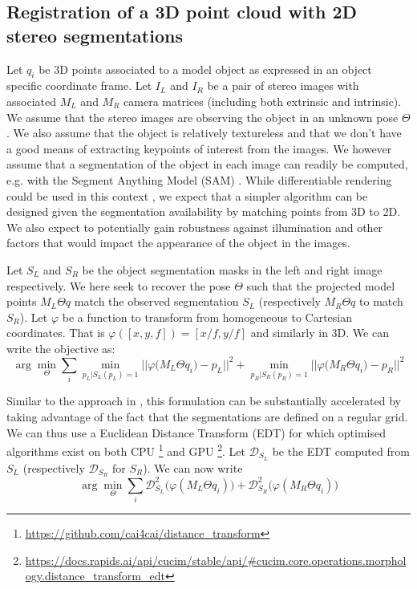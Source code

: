 \FloatBarrier
\subsection{Registration of a 3D point cloud with 2D stereo segmentations}
%
Let $q_i$ be 3D points associated to a model object as expressed in an object specific coordinate frame.
Let $I_L$ and $I_R$ be a pair of stereo images with associated $M_L$ and $M_R$ camera matrices (including both extrinsic and intrinsic).
We assume that the stereo images are observing the object in an unknown pose $\Theta$.
We also assume that the object is relatively textureless and that we don't have a good means of extracting keypoints of interest from the images.
We however assume that a segmentation of the object in each image can readily be computed, e.g. with the Segment Anything Model (SAM) \cite{Kirillov:arxiv:2023}.
%
While differentiable rendering could be used in this context \cite{Hannemose:SPIE:2019,Labbe:CVPR:2021,Chen:RAL:2023},
we expect that a simpler algorithm can be designed given the segmentation availability by matching points from 3D to 2D.
We also expect to potentially gain robustness against illumination and other factors that would impact the appearance of the object in the images.

Let $S_L$ and $S_R$ be the object segmentation masks in the left and right image respectively.
We here seek to recover the pose $\Theta$ such that the projected model points ${M_L \Theta q}$ match the observed segmentation $S_L$ (respectively ${M_R \Theta q}$ to match $S_R$).
Let $\varphi$ be a function to transform from homogeneous to Cartesian coordinates.
That is $\varphi([x,y,f])=[x/f,y/f]$ and similarly in 3D.
We can write the objective as:
\begin{equation}
\arg\min_{\Theta} \sum_i
\min_{p_L|S_L(p_L)=1}|| \varphi\big(M_L \Theta q_i\big) - p_L||^2
+ \min_{p_R|S_R(p_R)=1}|| \varphi\big(M_R \Theta q_i\big) - p_R||^2
\end{equation}

Similar to the approach in \cite{Fitzgibbon:IVC:2003}, this formulation can be substantially accelerated by taking advantage of the fact that the segmentations are defined on a regular grid. We can thus use a Euclidean Distance Transform (EDT) for which optimised algorithms exist on both CPU \cite{Felzenszwalb:TC:2012}\footnote{\url{https://github.com/cai4cai/distance_transform}} and GPU \cite{Cao:SIGGRAPH:2010}\footnote{\url{https://docs.rapids.ai/api/cucim/stable/api/\#cucim.core.operations.morphology.distance_transform_edt}}.
Let $\mathcal{D}_{S_L}$ be the EDT computed from $S_L$ (respectively $\mathcal{D}_{S_R}$ for $S_R$).
We can now write
\begin{equation}\label{eq:dt3d2d}
\arg\min_{\Theta} \sum_i \mathcal{D}_{S_L}^2\big( \varphi(M_L \Theta q_i) \big)
+ \mathcal{D}_{S_R}^2\big( \varphi(M_R \Theta q_i) \big)
\end{equation}

